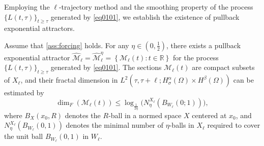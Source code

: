 \documentclass[oneside,preprint,12pt,numbers,sort&compress]{elsarticle}
\begin{document}
Employing the \(\ell\)-trajectory method and the smoothing property of the process \(\{ L(t, \tau) \}_{t \geq \tau}\) generated by \cref{eq0101}, we establish the existence of pullback exponential attractors.

\begin{theorem}\label{thm0402}
Assume that \cref{ass:forcing} holds. For any $\eta \in (0,\frac{1}{2})$, there exists a pullback exponential attractor $\hat{\mathcal{M}}_{\ell} = \hat{\mathcal{M}}_{\ell}^{\eta} = \left\{ \mathcal{M}_{\ell} (t): t \in \mathbb{R} \right\}$ for the process $ \{L(t,\tau)\}_{t\geq \tau} $ generated by \cref{eq0101}. The sections $\mathcal{M}_{\ell}(t)$ are compact subsets of $X_{\ell}$, and their fractal dimension in $ L^2(\tau,\tau+\ell;H_\sigma^{\alpha}(\Omega) \times H^{\beta}(\Omega))$ can be estimated by
\[
\dim_F(\mathcal{M}_{\ell}(t)) \leq \log_{\frac{1}{2\eta}}\bigl(N_{\eta}^{X_{\ell}}(B_{W_{\ell}}(0;1))\bigr),
\]
where $B_X(x_0, R)$ denotes the $R$-ball in a normed space $X$ centered at $x_0$, and $N_{\eta}^{X_{\ell}}(B_{W_{\ell}}(0, 1))$ denotes the minimal number of $\eta$-balls in $X_{\ell}$ required to cover the unit ball $B_{W_{\ell}}(0, 1)$ in $W_{\ell}$.
\end{theorem}
\end{document}
